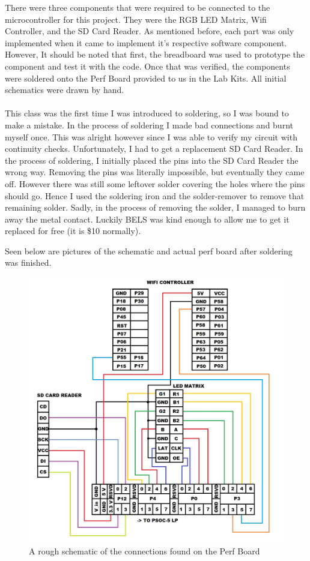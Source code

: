\documentclass[a4paper, 12pt]{article}
\begin{document}
    There were three components that were required to be connected to the
    microcontroller for this project. They were the RGB LED Matrix, Wifi
    Controller, and the SD Card Reader. As mentioned before, each part was
    only implemented when it came to implement it's respective software
    component. However, It should be noted that first, the breadboard
    was used to prototype the component and test it with the code. Once that
    was verified, the
    components were soldered onto the Perf Board provided to us in the Lab
    Kits. All initial schematics were drawn by hand. 
    \\ \\
    This class was the first time I was introduced to soldering, so I was
    bound to make a mistake. In the process of soldering I made bad
    connections and burnt myself once. This was alright however since I was
    able to verify my circuit with continuity checks. Unfortunately, I had to get a
    replacement SD Card Reader. In the process of soldering, I
    initially placed the pins into the SD Card Reader the wrong way. Removing 
    the pins was literally
    impossible, but eventually they came off. However there
    was still some leftover solder covering the holes where the pins should
    go. Hence I used the soldering iron and the solder-remover to
    remove that remaining solder. Sadly, in the process of removing the
    solder, I managed to burn away the metal contact. Luckily BELS was kind
    enough to allow me to get it replaced for free (it is \$10 normally).
    
    \clearpage
    Seen below are pictures of the schematic and actual perf board after
    soldering was finished.

    \begin{figure}[H]
        \centering
        \includegraphics[scale=0.3]{pics/perf}
        \caption{A rough schematic of the connections found on the Perf Board}
        \label{fig:SolderSetup}
    \end{figure}
\end{document}
